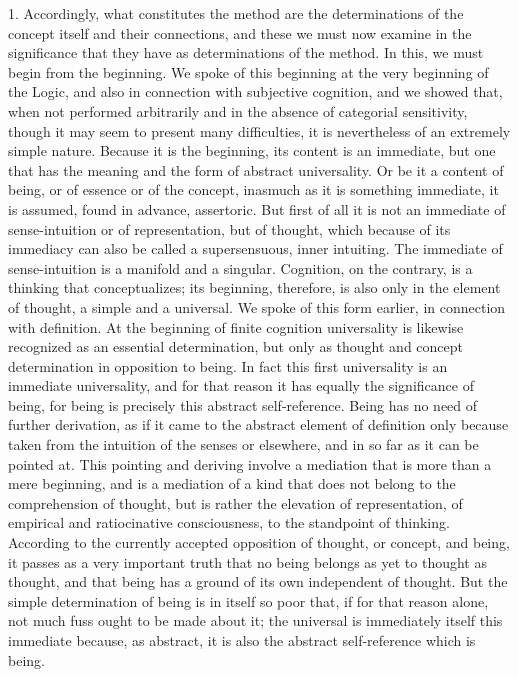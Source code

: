 1. Accordingly, what constitutes the method are
the determinations of the concept itself and their connections,
and these we must now examine in the significance
that they have as determinations of the method.
In this, we must begin from the beginning.
We spoke of this beginning at the very beginning of the Logic,
and also in connection with subjective cognition,
and we showed that, when not performed arbitrarily
and in the absence of categorial sensitivity,
though it may seem to present many difficulties,
it is nevertheless of an extremely simple nature.
Because it is the beginning, its content is an immediate,
but one that has the meaning and the form of abstract universality.
Or be it a content of being, or of essence or of the concept,
inasmuch as it is something immediate, it is assumed,
found in advance, assertoric.
But first of all it is not an immediate of
sense-intuition or of representation,
but of thought, which because of its immediacy can
also be called a supersensuous, inner intuiting.
The immediate of sense-intuition is a manifold and a singular.
Cognition, on the contrary, is a thinking that conceptualizes;
its beginning, therefore, is also only in the element of thought,
a simple and a universal.
We spoke of this form earlier, in connection with definition.
At the beginning of finite cognition universality is likewise
recognized as an essential determination,
but only as thought and concept
determination in opposition to being.
In fact this first universality is an immediate universality,
and for that reason it has equally the significance of being,
for being is precisely this abstract self-reference.
Being has no need of further derivation,
as if it came to the abstract element of definition
only because taken from the intuition of the senses or elsewhere,
and in so far as it can be pointed at.
This pointing and deriving involve a mediation
that is more than a mere beginning,
and is a mediation of a kind that does not
belong to the comprehension of thought,
but is rather the elevation of representation,
of empirical and ratiocinative consciousness,
to the standpoint of thinking.
According to the currently accepted opposition
of thought, or concept, and being,
it passes as a very important truth that
no being belongs as yet to thought as thought,
and that being has a ground of its own independent of thought.
But the simple determination of being is in itself so poor that,
if for that reason alone, not much fuss ought to be made about it;
the universal is immediately itself this immediate
because, as abstract, it is also the
abstract self-reference which is being.
